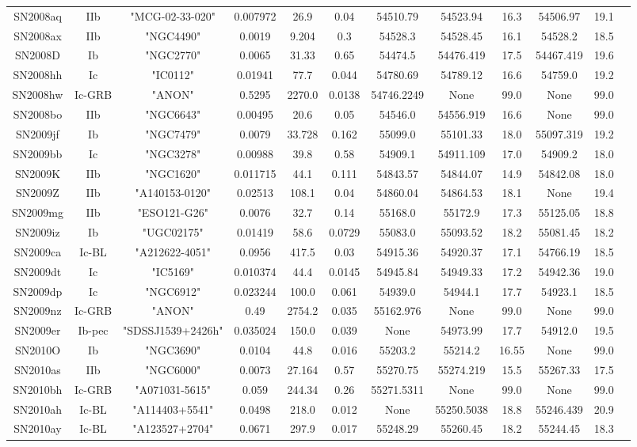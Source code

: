 \documentclass[onecolumn]{aa} %
\begin{document}
\begin{table*}
\begin{tabular}{cccccccccccc}
SN2008aq&IIb&"MCG-02-33-020"&0.007972&26.9&0.04&54510.79&54523.94&16.3&54506.97&19.1\\ 
SN2008ax&IIb&"NGC4490"&0.0019&9.204&0.3&54528.3&54528.45&16.1&54528.2&18.5\\ 
SN2008D&Ib&"NGC2770"&0.0065&31.33&0.65&54474.5&54476.419&17.5&54467.419&19.6\\ 
SN2008hh&Ic&"IC0112"&0.01941&77.7&0.044&54780.69&54789.12&16.6&54759.0&19.2\\ 
SN2008hw&Ic-GRB&"ANON"&0.5295&2270.0&0.0138&54746.2249&None&99.0&None&99.0\\ 
SN2008bo&IIb&"NGC6643"&0.00495&20.6&0.05&54546.0&54556.919&16.6&None&99.0\\ 
SN2009jf&Ib&"NGC7479"&0.0079&33.728&0.162&55099.0&55101.33&18.0&55097.319&19.2\\ 
SN2009bb&Ic&"NGC3278"&0.00988&39.8&0.58&54909.1&54911.109&17.0&54909.2&18.0\\ 
SN2009K&IIb&"NGC1620"&0.011715&44.1&0.111&54843.57&54844.07&14.9&54842.08&18.0\\ 
SN2009Z&IIb&"A140153-0120"&0.02513&108.1&0.04&54860.04&54864.53&18.1&None&19.4\\ 
SN2009mg&IIb&"ESO121-G26"&0.0076&32.7&0.14&55168.0&55172.9&17.3&55125.05&18.8\\ 
SN2009iz&Ib&"UGC02175"&0.01419&58.6&0.0729&55083.0&55093.52&18.2&55081.45&18.2\\ 
SN2009ca&Ic-BL&"A212622-4051"&0.0956&417.5&0.03&54915.36&54920.37&17.1&54766.19&18.5\\ 
SN2009dt&Ic&"IC5169"&0.010374&44.4&0.0145&54945.84&54949.33&17.2&54942.36&19.0\\ 
SN2009dp&Ic&"NGC6912"&0.023244&100.0&0.061&54939.0&54944.1&17.7&54923.1&18.5\\ 
SN2009nz&Ic-GRB&"ANON"&0.49&2754.2&0.035&55162.976&None&99.0&None&99.0\\ 
SN2009er&Ib-pec&"SDSSJ1539+2426h"&0.035024&150.0&0.039&None&54973.99&17.7&54912.0&19.5\\ 
SN2010O&Ib&"NGC3690"&0.0104&44.8&0.016&55203.2&55214.2&16.55&None&99.0\\ 
SN2010as&IIb&"NGC6000"&0.0073&27.164&0.57&55270.75&55274.219&15.5&55267.33&17.5\\ 
SN2010bh&Ic-GRB&"A071031-5615"&0.059&244.34&0.26&55271.5311&None&99.0&None&99.0\\ 
SN2010ah&Ic-BL&"A114403+5541"&0.0498&218.0&0.012&None&55250.5038&18.8&55246.439&20.9\\ 
SN2010ay&Ic-BL&"A123527+2704"&0.0671&297.9&0.017&55248.29&55260.45&18.2&55244.45&18.3\\ 

\end{tabular}
\end{table*}
\end{document}
